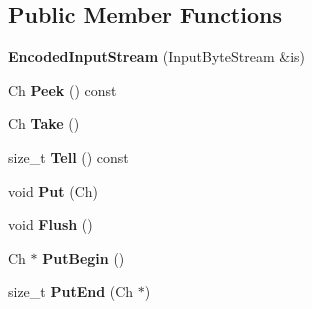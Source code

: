 \subsection*{Public Member Functions}
\begin{DoxyCompactItemize}
\item 
{\bfseries Encoded\+Input\+Stream} (Input\+Byte\+Stream \&is)\hypertarget{class_encoded_input_stream_a17f8e629500f6ae71cb72d1d63bf41fd}{}\label{class_encoded_input_stream_a17f8e629500f6ae71cb72d1d63bf41fd}

\item 
Ch {\bfseries Peek} () const \hypertarget{class_encoded_input_stream_abda3b0c141254343f4c481f67d52b423}{}\label{class_encoded_input_stream_abda3b0c141254343f4c481f67d52b423}

\item 
Ch {\bfseries Take} ()\hypertarget{class_encoded_input_stream_ab42cd57581bf62e42af471583e5b8377}{}\label{class_encoded_input_stream_ab42cd57581bf62e42af471583e5b8377}

\item 
size\+\_\+t {\bfseries Tell} () const \hypertarget{class_encoded_input_stream_a34cdb99fd81cd211f71903348e9c986f}{}\label{class_encoded_input_stream_a34cdb99fd81cd211f71903348e9c986f}

\item 
void {\bfseries Put} (Ch)\hypertarget{class_encoded_input_stream_afea36b666a44bd4adeabfcab7b68a322}{}\label{class_encoded_input_stream_afea36b666a44bd4adeabfcab7b68a322}

\item 
void {\bfseries Flush} ()\hypertarget{class_encoded_input_stream_aa4415bf4b97dd01e8c3de0ad7a161724}{}\label{class_encoded_input_stream_aa4415bf4b97dd01e8c3de0ad7a161724}

\item 
Ch $\ast$ {\bfseries Put\+Begin} ()\hypertarget{class_encoded_input_stream_ad97f7a549a8622c61b7fb2c63fedd69b}{}\label{class_encoded_input_stream_ad97f7a549a8622c61b7fb2c63fedd69b}

\item 
size\+\_\+t {\bfseries Put\+End} (Ch $\ast$)\hypertarget{class_encoded_input_stream_a83fe5ed281413d6005d1b324730e8bed}{}\label{class_encoded_input_stream_a83fe5ed281413d6005d1b324730e8bed}

\end{DoxyCompactItemize}
